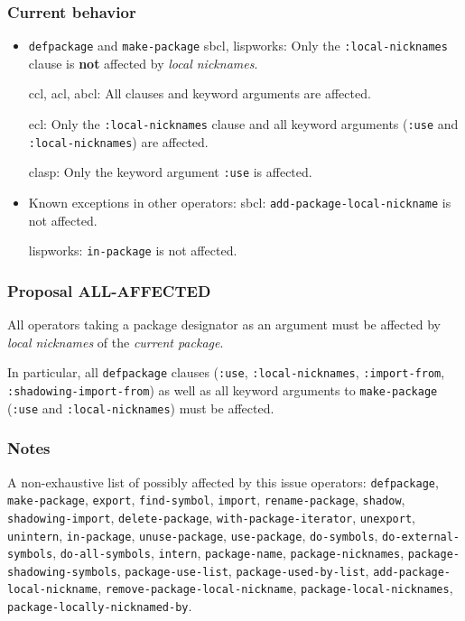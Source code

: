 \documentclass[11pt]{article}
\begin{document}
\subsubsection{Current behavior}
\label{sec:org71461e1}
\begin{itemize}
\item \texttt{defpackage} and \texttt{make-package}
sbcl, lispworks:
  Only the \texttt{:local-nicknames} clause is \textbf{not} affected by \emph{local nicknames}.

ccl, acl, abcl:
  All clauses and keyword arguments are affected.

ecl:
  Only the \texttt{:local-nicknames} clause and all keyword arguments (\texttt{:use} and
  \texttt{:local-nicknames}) are affected.

clasp:
  Only the keyword argument \texttt{:use} is affected.
\item Known exceptions in other operators:
sbcl: \texttt{add-package-local-nickname} is not affected.

lispworks: \texttt{in-package} is not affected.
\end{itemize}
\subsubsection{Proposal ALL-AFFECTED}
\label{sec:org4facc91}
All operators taking a package designator as an argument must be affected by
\emph{local nicknames} of the \emph{current package}.

In particular, all \texttt{defpackage} clauses (\texttt{:use}, \texttt{:local-nicknames},
\texttt{:import-from}, \texttt{:shadowing-import-from}) as well as all keyword arguments to
\texttt{make-package} (\texttt{:use} and \texttt{:local-nicknames}) must be affected.
\subsubsection{Notes}
\label{sec:orgb744635}
A non-exhaustive list of possibly affected by this issue operators:
  \texttt{defpackage}, \texttt{make-package}, \texttt{export}, \texttt{find-symbol}, \texttt{import},
  \texttt{rename-package}, \texttt{shadow}, \texttt{shadowing-import}, \texttt{delete-package},
  \texttt{with-package-iterator}, \texttt{unexport}, \texttt{unintern}, \texttt{in-package}, \texttt{unuse-package},
  \texttt{use-package}, \texttt{do-symbols}, \texttt{do-external-symbols}, \texttt{do-all-symbols}, \texttt{intern},
  \texttt{package-name}, \texttt{package-nicknames}, \texttt{package-shadowing-symbols},
  \texttt{package-use-list}, \texttt{package-used-by-list}, \texttt{add-package-local-nickname},
  \texttt{remove-package-local-nickname}, \texttt{package-local-nicknames},
  \texttt{package-locally-nicknamed-by}.
\end{document}
